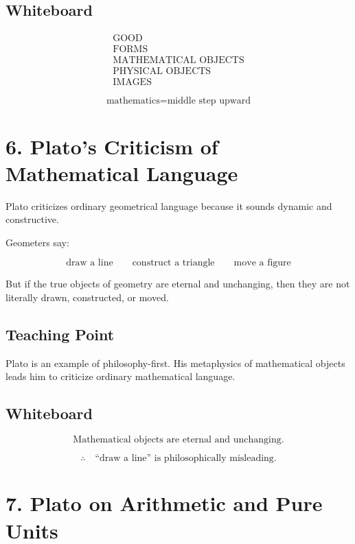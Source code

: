 \documentclass[11pt]{article}
\begin{document}
\subsection*{Whiteboard}

\[
\begin{array}{c}
\text{GOOD} \\
\hline
\text{FORMS} \\
\hline
\text{MATHEMATICAL OBJECTS} \\
\hline
\text{PHYSICAL OBJECTS} \\
\hline
\text{IMAGES}
\end{array}
\]

\[
\text{mathematics} = \text{middle step upward}
\]

\section*{6. Plato's Criticism of Mathematical Language}

Plato criticizes ordinary geometrical language because it sounds dynamic and constructive.

Geometers say:

\[
\text{draw a line}
\qquad
\text{construct a triangle}
\qquad
\text{move a figure}
\]

But if the true objects of geometry are eternal and unchanging, then they are not literally
drawn, constructed, or moved.

\subsection*{Teaching Point}

Plato is an example of philosophy-first. His metaphysics of mathematical objects leads him
to criticize ordinary mathematical language.

\subsection*{Whiteboard}

\[
\text{Mathematical objects are eternal and unchanging.}
\]

\[
\therefore
\quad
\text{``draw a line'' is philosophically misleading.}
\]

\section*{7. Plato on Arithmetic and Pure Units}
\end{document}
